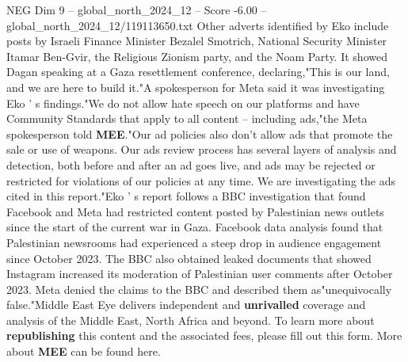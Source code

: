 \begin{textsample}{NEG Dim 9 – global\_north\_2024\_12 – Score -6.00 – global\_north\_2024\_12/119113650.txt}
Other adverts identified by Eko include posts by Israeli Finance Minister Bezalel Smotrich, National Security Minister Itamar Ben-Gvir, the Religious Zionism party, and the Noam Party.
It showed Dagan speaking at a Gaza resettlement conference, declaring,"This is our land, and we are here to build it."A spokesperson for Meta said it was investigating Eko ' s findings."We do not allow hate speech on our platforms and have Community Standards that apply to all content -- including ads,"the Meta spokesperson told \textbf{MEE}."Our ad policies also don't allow ads that promote the sale or use of weapons.
Our ads review process has several layers of analysis and detection, both before and after an ad goes live, and ads may be rejected or restricted for violations of our policies at any time.
We are investigating the ads cited in this report."Eko ' s report follows a BBC investigation that found Facebook and Meta had restricted content posted by Palestinian news outlets since the start of the current war in Gaza.
Facebook data analysis found that Palestinian newsrooms had experienced a steep drop in audience engagement since October 2023.
The BBC also obtained leaked documents that showed Instagram increased its moderation of Palestinian user comments after October 2023.
Meta denied the claims to the BBC and described them as"unequivocally false."Middle East Eye delivers independent and \textbf{unrivalled} coverage and analysis of the Middle East, North Africa and beyond.
To learn more about \textbf{republishing} this content and the associated fees, please fill out this form.
More about \textbf{MEE} can be found here.

\end{textsample}
